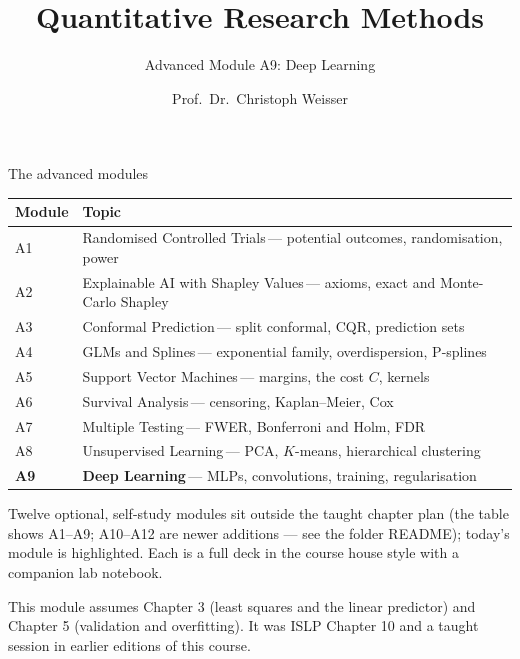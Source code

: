 \documentclass[aspectratio=169,11pt]{beamer}
\title{Quantitative Research Methods}
\subtitle{Advanced Module A9: Deep Learning}
\author{Prof.\ Dr.\ Christoph Weisser}
\date{}\graphicspath{{images/}}
\begin{document}
\begin{frame}[plain]\titlepage\end{frame}

\begin{frame}{The advanced modules}
  \vspace{-1.5mm}
  \begin{center}
  \scriptsize
  \setlength{\tabcolsep}{5pt}
  \renewcommand{\arraystretch}{1.30}
  \begin{tabular}{@{\hspace{2pt}}l >{\raggedright\arraybackslash}p{}@{\hspace{2pt}}}
    \toprule
    \textbf{Module} & \textbf{Topic} \\
    \midrule
     {\color{accent}A1} & Randomised Controlled Trials\,{\color{black!45}--- potential outcomes, randomisation, power} \\
    \rowcolor{black!3} {\color{accent}A2} & Explainable AI with Shapley Values\,{\color{black!45}--- axioms, exact and Monte-Carlo Shapley} \\
     {\color{accent}A3} & Conformal Prediction\,{\color{black!45}--- split conformal, CQR, prediction sets} \\
    \rowcolor{black!3} {\color{accent}A4} & GLMs and Splines\,{\color{black!45}--- exponential family, overdispersion, P-splines} \\
     {\color{accent}A5} & Support Vector Machines\,{\color{black!45}--- margins, the cost $C$, kernels} \\
    \rowcolor{black!3} {\color{accent}A6} & Survival Analysis\,{\color{black!45}--- censoring, Kaplan--Meier, Cox} \\
     {\color{accent}A7} & Multiple Testing\,{\color{black!45}--- FWER, Bonferroni and Holm, FDR} \\
    \rowcolor{black!3} {\color{accent}A8} & Unsupervised Learning\,{\color{black!45}--- PCA, $K$-means, hierarchical clustering} \\
    \rowcolor{accent!18} \textbf{A9} & \textbf{Deep Learning}\,{\color{accent!75!black}--- MLPs, convolutions, training, regularisation} \\
    \bottomrule
  \end{tabular}
  \end{center}
  \vspace{2mm}
  {\scriptsize Twelve optional, self-study modules sit outside the taught
  chapter plan (the table shows A1--A9; A10--A12 are newer additions --- see the folder README); today's module is highlighted. Each is a full deck in the course
  house style with a companion lab notebook.\par\medskip This module assumes Chapter 3 (least squares and the linear predictor) and Chapter 5 (validation and overfitting). It was ISLP Chapter 10 and a taught session in earlier editions of this course.}
\end{frame}
\end{document}
